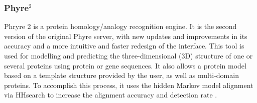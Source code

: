 \documentclass[11pt, letterpaper, english]{article}
\begin{document}
        \subsubsection{Phyre\texorpdfstring{$^2$}{Lg}}
        \par{Phryre 2 is a protein homology/analogy recognition engine. It is the second version of the original Phyre server, with new updates and improvements in its accuracy and a more intuitive and faster redesign of the interface. This tool is used for modelling and predicting the three-dimensional (3D) structure of one or several proteins using protein or gene sequences. It also allows a protein model based on a template structure provided by the user, as well as multi-domain proteins. To accomplish this process, it uses the hidden Markov model alignment via HHsearch to increase the alignment accuracy and detection rate \cite{Kelley_2017}.}  
        
\end{document}
